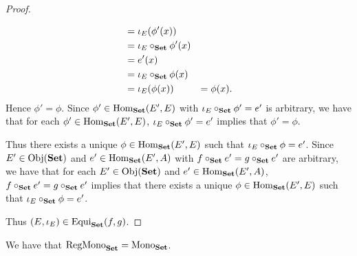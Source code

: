 \documentclass{book}
\begin{document}
\begin{proof}
\begin{enumerate}
\begin{itemize}
\begin{align*}
					& = \iota_E (\phi'(x)) \\
					& = \iota_E \circ_{\text{\textbf{Set}}} \phi'(x) \\
					& = e'(x) \\
					& = \iota_E \circ_{\text{\textbf{Set}}} \phi(x) \\
					& = \iota_E (\phi(x)) 
					& = \phi(x).
				\end{align*}
				Hence $\phi' = \phi$. Since $\phi' \in \operatorname{Hom}_{\text{\textbf{Set}}}(E', E)$ with $\iota_E \circ_{\text{\textbf{Set}}} \phi' = e'$ is arbitrary, we have that for each $\phi' \in \operatorname{Hom}_{\text{\textbf{Set}}}(E', E)$, $\iota_E \circ_{\text{\textbf{Set}}} \phi' = e'$ implies that $\phi' = \phi$.
			\end{itemize} 
			Thus there exists a unique $\phi \in \operatorname{Hom}_{\text{\textbf{Set}}}(E', E)$ such that $\iota_E \circ_{\text{\textbf{Set}}} \phi = e'$. Since $E' \in \operatorname{Obj}(\text{\textbf{Set}})$ and $e' \in \operatorname{Hom}_{\text{\textbf{Set}}}(E',A)$ with $f \circ_{\text{\textbf{Set}}} e' = g \circ_{\text{\textbf{Set}}} e'$ are arbitrary, we have that for each $E' \in \operatorname{Obj}(\text{\textbf{Set}})$ and $e' \in \operatorname{Hom}_{\text{\textbf{Set}}}(E',A)$, $f \circ_{\text{\textbf{Set}}} e' = g \circ_{\text{\textbf{Set}}} e'$ implies that there exists a unique $\phi \in \operatorname{Hom}_{\text{\textbf{Set}}}(E', E)$ such that $\iota_E \circ_{\text{\textbf{Set}}} \phi = e'$. 
		\end{enumerate}
		Thus $(E, \iota_E) \in \operatorname{Equi}_{\text{\textbf{Set}}}(f,g)$. 
	\end{proof}
	
	\begin{ex}
		We have that $\operatorname{RegMono}_{\text{\textbf{Set}}} = \operatorname{Mono}_{\text{\textbf{Set}}}$.
	\end{ex}
	
\end{document}
